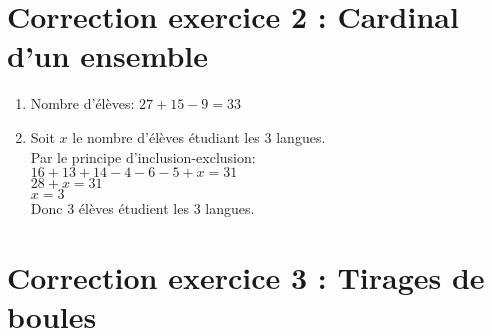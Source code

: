 \section*{Correction exercice 2 : Cardinal d'un ensemble}

\begin{enumerate}
    \item Nombre d'élèves: \(27 + 15 - 9 = 33\)
    \item Soit \(x\) le nombre d'élèves étudiant les 3 langues.\\
    Par le principe d'inclusion-exclusion:\\
    \(16 + 13 + 14 - 4 - 6 - 5 + x = 31\)\\
    \(28 + x = 31\)\\
    \(x = 3\)\\
    Donc 3 élèves étudient les 3 langues.
\end{enumerate}

\section*{Correction exercice 3 : Tirages de boules}

